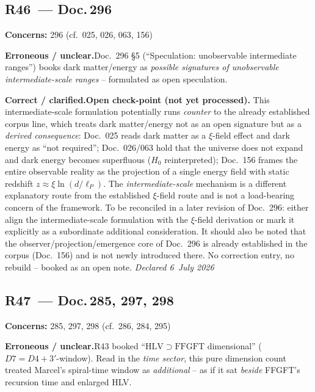 \medskip


\subsection*{R46~--- Doc.\,296}

\noindent\textbf{Concerns:} 296 (cf.\ 025, 026, 063, 156)


\smallskip\noindent\textbf{Erroneous / unclear.}\quad Doc.~296 §5 (\enquote{Speculation: unobservable intermediate ranges}) books dark matter/energy as \emph{possible signatures of unobservable intermediate-scale ranges} -- formulated as open speculation.


\smallskip\noindent\textbf{Correct / clarified.}\quad \textbf{Open check-point (not yet processed).} This intermediate-scale formulation potentially runs \emph{counter} to the already established corpus line, which treats dark matter/energy not as an open signature but as a \emph{derived consequence}: Doc.~025 reads dark matter as a $\xi$-field effect and dark energy as \enquote{not required}; Doc.~026/063 hold that the universe does not expand and dark energy becomes superfluous ($H_0$ reinterpreted); Doc.~156 frames the entire observable reality as the projection of a single energy field with static redshift $z \approx \xi\ln(d/\ell_P)$. The \emph{intermediate-scale} mechanism is a different explanatory route from the established $\xi$-field route and is not a load-bearing concern of the framework. To be reconciled in a later revision of Doc.~296: either align the intermediate-scale formulation with the $\xi$-field derivation or mark it explicitly as a subordinate additional consideration. It should also be noted that the observer/projection/emergence core of Doc.~296 is already established in the corpus (Doc.~156) and is not newly introduced there. No correction entry, no rebuild -- booked as an open note. \emph{Declared 6~July 2026}


\medskip


\subsection*{R47~--- Doc.\,285, 297, 298}

\noindent\textbf{Concerns:} 285, 297, 298 (cf.\ 286, 284, 295)


\smallskip\noindent\textbf{Erroneous / unclear.}\quad R43 booked \enquote{$\mathrm{HLV}\supset\mathrm{FFGFT}$ dimensional} ($D7=D4+3'$-window). Read in the \emph{time sector}, this pure dimension count treated Marcel's spiral-time window as \emph{additional} -- as if it sat \emph{beside} FFGFT's recursion time and enlarged HLV.


